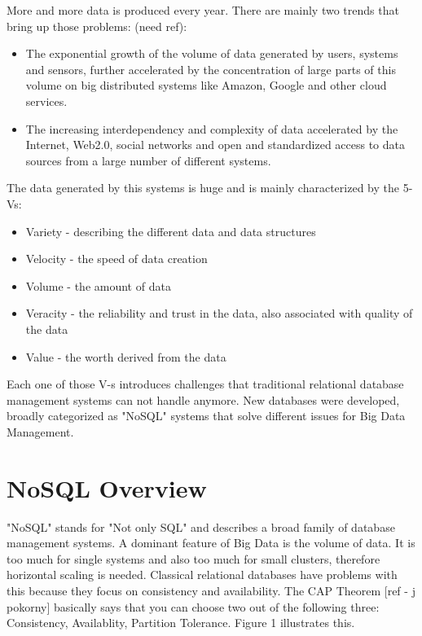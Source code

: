 \documentclass{acm_proc_article-sp}
\begin{document}
More and more data is produced every year. There are mainly two trends that bring up those problems: (need ref):
\begin{itemize}
	\item The exponential growth of the volume of data generated by users, systems and sensors, further accelerated by the concentration of large parts of this volume on big distributed systems like Amazon, Google and other cloud services. 
	\item The increasing interdependency and complexity of data accelerated by the Internet, Web2.0, social networks and open and standardized access to data sources from a large number of different systems.
\end{itemize}

The data generated by this systems is huge and is mainly characterized by the 5-Vs:

\begin{itemize}
	\item Variety - describing the different data and data structures
	\item Velocity - the speed of data creation
	\item Volume - the amount of data
	\item Veracity - the reliability and trust in the data, also associated with quality of the data
	\item Value - the worth derived from the data
\end{itemize}

Each one of those V-s introduces challenges that traditional relational database management systems can not handle anymore. New databases were developed, broadly categorized as "NoSQL" systems that solve different issues for Big Data Management.

\section{NoSQL Overview}

"NoSQL" stands for "Not only SQL" and describes a broad family of database management systems. A dominant feature of Big Data is the volume of data. It is too much for single systems and also too much for small clusters, therefore horizontal scaling is needed. Classical relational databases have problems with this because they focus on consistency and availability. The CAP Theorem [ref - j pokorny] basically says that you can choose two out of the following three: Consistency, Availablity, Partition Tolerance. Figure 1 illustrates this.
\end{document}
